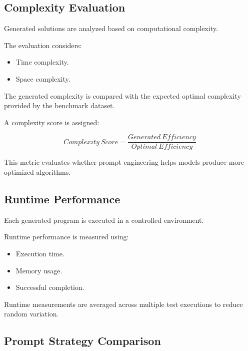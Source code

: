 \subsection{Complexity Evaluation}


Generated solutions are analyzed based on computational complexity.


The evaluation considers:


\begin{itemize}

\item Time complexity.

\item Space complexity.

\end{itemize}


The generated complexity is compared with the expected optimal complexity
provided by the benchmark dataset.


A complexity score is assigned:


\[
Complexity\ Score =
\frac{Generated\ Efficiency}{Optimal\ Efficiency}
\]


This metric evaluates whether prompt engineering helps models produce more
optimized algorithms.



\subsection{Runtime Performance}


Each generated program is executed in a controlled environment.


Runtime performance is measured using:

\begin{itemize}

\item Execution time.

\item Memory usage.

\item Successful completion.

\end{itemize}


Runtime measurements are averaged across multiple test executions to reduce
random variation.



\subsection{Prompt Strategy Comparison}


